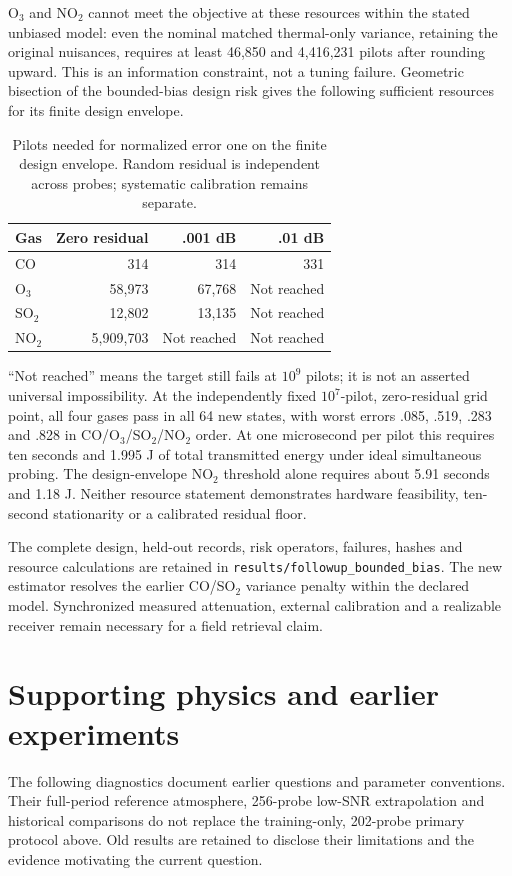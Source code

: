 \documentclass[conference]{IEEEtran}
\begin{document}
O$_3$ and NO$_2$ cannot meet the objective at these resources within the stated unbiased model: even the nominal matched thermal-only variance, retaining the original nuisances, requires at least 46,850 and 4,416,231 pilots after rounding upward. This is an information constraint, not a tuning failure. Geometric bisection of the bounded-bias design risk gives the following sufficient resources for its finite design envelope.

\begin{table}[t]\centering\scriptsize
\caption{Pilots needed for normalized error one on the finite design envelope. Random residual is independent across probes; systematic calibration remains separate.}
\setlength{\tabcolsep}{3pt}
\begin{tabular}{lrrr}\toprule
Gas & Zero residual & .001 dB & .01 dB\\\midrule
CO & 314 & 314 & 331\\
O$_3$ & 58,973 & 67,768 & Not reached\\
SO$_2$ & 12,802 & 13,135 & Not reached\\
NO$_2$ & 5,909,703 & Not reached & Not reached\\
\bottomrule\end{tabular}
\end{table}
``Not reached'' means the target still fails at $10^9$ pilots; it is not an asserted universal impossibility. At the independently fixed $10^7$-pilot, zero-residual grid point, all four gases pass in all 64 new states, with worst errors .085, .519, .283 and .828 in CO/O$_3$/SO$_2$/NO$_2$ order. At one microsecond per pilot this requires ten seconds and 1.995 J of total transmitted energy under ideal simultaneous probing. The design-envelope NO$_2$ threshold alone requires about 5.91 seconds and 1.18 J. Neither resource statement demonstrates hardware feasibility, ten-second stationarity or a calibrated residual floor.

The complete design, held-out records, risk operators, failures, hashes and resource calculations are retained in \texttt{results/followup\_bounded\_bias}. The new estimator resolves the earlier CO/SO$_2$ variance penalty within the declared model. Synchronized measured attenuation, external calibration and a realizable receiver remain necessary for a field retrieval claim.



\section{Supporting physics and earlier experiments}
The following diagnostics document earlier questions and parameter conventions. Their full-period reference atmosphere, 256-probe low-SNR extrapolation and historical comparisons do not replace the training-only, 202-probe primary protocol above. Old results are retained to disclose their limitations and the evidence motivating the current question.
\end{document}

